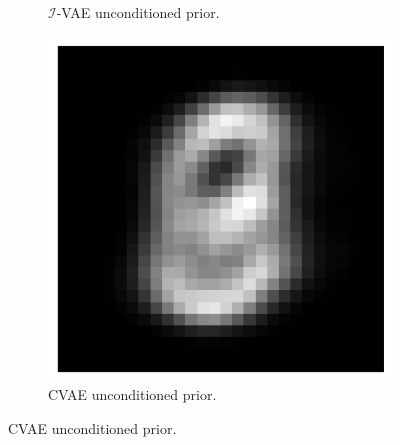 \begin{figure}[t!]
\begin{subfigure}[t]{0.32\linewidth}
        \caption{$\mathcal{I}$-VAE unconditioned prior.}
        \label{fig:mnist_ivae_prior}
    \end{subfigure}
    \hfill
    \begin{subfigure}[t]{0.32\linewidth}
        \centering
        \includegraphics[width=0.9\linewidth]{figures/ivae/mnist/mnist-cvae-prior.png}
        \caption{CVAE unconditioned prior.}
        \label{fig:mnist_cvae_prior}
    \end{subfigure}

    \vspace*{5mm}


\end{figure}
